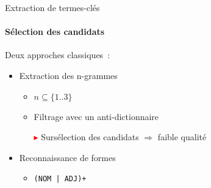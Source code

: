   \begin{frame}{Extraction de termes-clés}
    \framesubtitle{Sélection des candidats}

    Deux approches classiques~:
    \begin{itemize}
      \item{Extraction des n-grammes}
        \begin{itemize}
          \item{$n \subseteq \{1..3\}$}
          \item{Filtrage avec un anti-dictionnaire}
          \item[\textcolor{red}{\scriptsize$\blacktriangleright$}]{Sursélection des candidats $\Rightarrow$ faible qualité}
        \end{itemize}
      \item{Reconnaissance de formes}
        \begin{itemize}
          \item{\texttt{(NOM | ADJ)+}}
        \end{itemize}
    \end{itemize}

  \end{frame}

